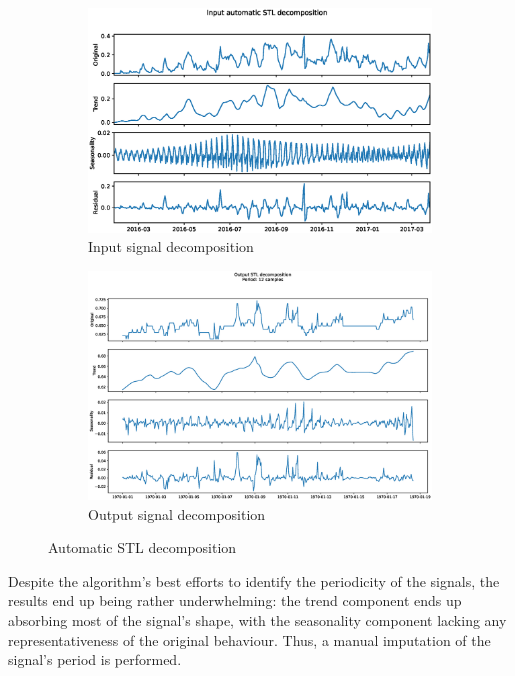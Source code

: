 \documentclass{scrartcl}
\begin{document}
  \begin{figure}[ht]
    \centering
    \begin{subfigure}[b]{0.8\textwidth}
      \centering
      \includegraphics[width=\textwidth]{./figures/x_decomp.eps}
      \caption{Input signal decomposition}
      \label{fig:x_decomp}
    \end{subfigure}
    \hfill
    \begin{subfigure}[b]{0.8\textwidth}
      \centering
      \includegraphics[width=\textwidth]{./figures/y_decomp.eps}
      \caption{Output signal decomposition}
      \label{fig:y_decomp}
    \end{subfigure}
    \caption{Automatic STL decomposition}
    \label{fig:STL_auto}
  \end{figure}

  Despite the algorithm's best efforts to identify the periodicity of the signals, the results end up being rather underwhelming: the trend component ends up absorbing most of the signal's shape, with the seasonality component lacking any representativeness of the original behaviour. Thus, a manual imputation of the signal's period is performed.
\end{document}
